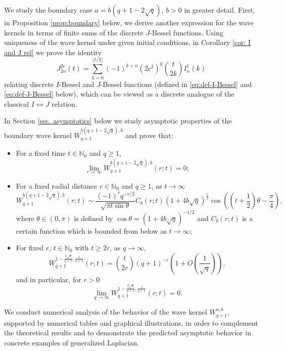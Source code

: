 \documentclass[12pt]{amsart}
\numberwithin{equation}{section}
\theoremstyle{boldremark}
\begin{document}
We study the boundary case $a=b(q+1-2\sqrt{q})$, $b>0$ in greater detail. First, in  Proposition \ref{prop:boundary} below, we derive another expression for the wave kernels in terms of finite sums of the discrete $J$-Bessel functions. Using uniqueness of the wave kernel under given initial conditions, in Corollary  \ref{cor: I and J rel} we prove the identity 
  \begin{equation}\label{discrete_analog}
        J_{2n}^{2c}(t)=\sum_{k=0}^{\lfloor t/2 \rfloor}(-1)^{k+n} (2c^2)^k \binom{t}{2k} I_{n}^{1}(k)
\end{equation}
relating discrete $I$-Bessel and $J$-Bessel functions (defined in \eqref{eq:def-I-Bessel} and \eqref{eq:def-J-Bessel} below), which can be viewed as a discrete analogue of the classical $I\leftrightarrow J$ relation.

In Section \ref{sec. asymptotics} below we study asymptotic properties of the boundary wave kernel $W_{q+1}^{b(q+1-2\sqrt{q}),b}$ and prove that:
\begin{itemize}
    \item For a fixed time $t\in\mathbb{N}_0$ and $q\geq 1$,
$$
\lim_{r\to\infty}W_{q+1}^{b(q+1-2\sqrt{q}),b}(r;t)=0;
$$
\item For a fixed radial distance $r\in\mathbb{N}_0$ and $q\geq 1$, as $t\to\infty$
$$
W_{q+1}^{b(q+1-2\sqrt{q}),b}(r;t)\sim \frac{(-1)^rq^{-r/2}}{\sqrt{\pi t\sin\theta}} C_b(r;t)\left( 1+4b\sqrt{q}
\right) ^{\frac{t}{2}}\cos \left( \left( t+\frac{1}{2}\right)
\theta -\frac{ \pi}{4} \right),
$$
where $\theta\in(0,\pi)$ is defined by $\cos\theta=(1+4b\sqrt{q})^{-1/2}$ and $C_b(r;t)$ is a certain function which is bounded from below as $t\to\infty$;
\item For fixed $r,\, t \in \mathbb{N}_0$ with $t \ge 2r$, as $q \to \infty$,
$$
W^{1-\frac{2\sqrt{q}}{q+1}, \frac{1}{q+1}}_{q+1}(r;t)
= \binom{t}{2r}(q+1)^{-r}\left(1+O\left(\frac{1}{\sqrt{q}}\right)\right),
$$
and in particular, for $r>0$
$$
\lim_{q \to \infty} W^{1-\frac{2\sqrt{q}}{q+1}, \frac{1}{q+1}}_{q+1}(r;t) = 0.
$$
\end{itemize}
We conduct numerical analysis of the behavior of the wave kernel $W_{q+1}^{a,b}$, supported by numerical tables and graphical illustrations, in order to complement the theoretical results and to demonstrate the predicted asymptotic behavior in concrete examples of generalized Laplacian. 
\end{document}
